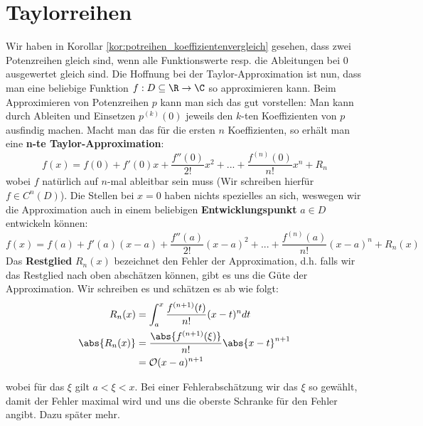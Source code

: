 \section{Taylorreihen}
Wir haben in Korollar \ref{kor:potreihen_koeffizientenvergleich} gesehen, dass zwei Potenzreihen gleich sind, wenn alle Funktionswerte resp. die Ableitungen bei 0 ausgewertet gleich sind. Die Hoffnung bei der Taylor-Approximation ist nun, dass man eine beliebige Funktion $f: D \subseteq \R \to \C$ so approximieren kann. Beim Approximieren von Potenzreihen $p$ kann man sich das gut vorstellen: Man kann durch Ableiten und Einsetzen $p^{(k)}(0)$ jeweils den $k$-ten Koeffizienten von $p$ ausfindig machen. Macht man das für die ersten $n$ Koeffizienten, so erhält man eine \textbf{n-te Taylor-Approximation}:
$$f(x) = f(0) + f'(0)x + \frac{f''(0)}{2!}x^2+...+\frac{f^{(n)}(0)}{n!}x^n + R_n$$
wobei $f$ natürlich auf $n$-mal ableitbar sein muss (Wir schreiben hierfür $f \in C^n(D)$). Die Stellen bei $x=0$ haben nichts spezielles an sich, weswegen wir die Approximation auch in einem beliebigen \textbf{Entwicklungspunkt} $a \in D$ entwickeln können:
$$f(x) = f(a) + f'(a)(x-a) + \frac{f''(a)}{2!}(x-a)^2+...+\frac{f^{(n)}(a)}{n!}(x-a)^n + R_n(x)$$
Das \textbf{Restglied} $R_n(x)$ bezeichnet den Fehler der Approximation, d.h. falls wir das Restglied nach oben abschätzen können, gibt es uns die Güte der Approximation. Wir schreiben es und schätzen es ab wie folgt:
\begin{align*}
    R_n(x)&=\int_a^x\frac{f^{(n+1)}(t)}{n!}(x-t)^n dt\\
    \abs{R_n(x)}&=\frac{\abs{f^{(n+1)}(\xi)}}{n!}\abs{x-t}^{n+1}\\
        &=\mathcal{O}(x-a)^{n+1}
\end{align*}

wobei für das $\xi$ gilt $a<\xi<x$. Bei einer Fehlerabschätzung wir das $\xi$ so gewählt, damit der Fehler maximal wird und uns die oberste Schranke für den Fehler angibt. Dazu später mehr.

